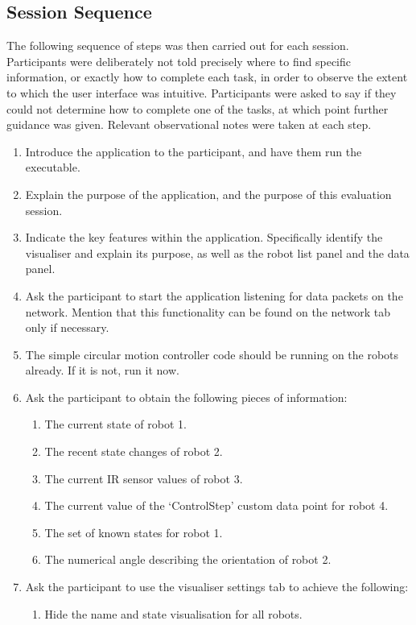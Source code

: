 \subsection{Session Sequence}
The following sequence of steps was then carried out for each session. Participants were deliberately not told precisely where to find specific information, or exactly how to complete each task, in order to observe the extent to which the user interface was intuitive. Participants were asked to say if they could not determine how to complete one of the tasks, at which point further guidance was given. Relevant observational notes were taken at each step.

\begin{enumerate}
 \item Introduce the application to the participant, and have them run the executable.
 \item Explain the purpose of the application, and the purpose of this evaluation session.
 \item Indicate the key features within the application. Specifically identify the visualiser and explain its purpose, as well as the robot list panel and the data panel.
 \item Ask the participant to start the application listening for data packets on the network. Mention that this functionality can be found on the network tab only if necessary.
 \item The simple circular motion controller code should be running on the robots already. If it is not, run it now.
 \item Ask the participant to obtain the following pieces of information:
 \begin{enumerate}
  \item The current state of robot 1.
  \item The recent state changes of robot 2.
  \item The current IR sensor values of robot 3.
  \item The current value of the `ControlStep' custom data point for robot 4.
  \item The set of known states for robot 1.
  \item The numerical angle describing the orientation of robot 2.
 \end{enumerate}
 \item Ask the participant to use the visualiser settings tab to achieve the following:
 \begin{enumerate}
  \item Hide the name and state visualisation for all robots.

\end{enumerate}
\end{enumerate}
